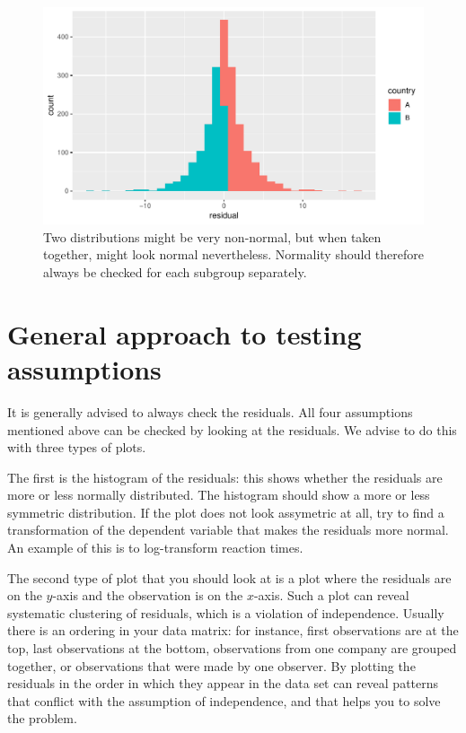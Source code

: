 \documentclass[]{report}\usepackage[]{graphicx}\usepackage[]{color}
\makeatletter
\def\maxwidth{ %
  \ifdim\Gin@nat@width>\linewidth
    \linewidth
  \else
    \Gin@nat@width
  \fi
}
\newenvironment{knitrout}{}{} %
\makeatother
\begin{document}
\begin{knitrout}
\color{fgcolor}\begin{figure}

{\centering \includegraphics[width=\maxwidth]{figure/ass_21a-1} 

}

\caption[Two distributions might be very non-normal, but when taken together, might look normal nevertheless]{Two distributions might be very non-normal, but when taken together, might look normal nevertheless. Normality should therefore always be checked for each subgroup separately.}\label{fig:ass_21a}
\end{figure}


\end{knitrout}



\section{General approach to testing assumptions}

It is generally advised to always check the residuals. All four assumptions mentioned above can be checked by looking at the residuals. We advise to do this with three types of plots. 

The first is the histogram of the residuals: this shows whether the residuals are more or less normally distributed. The histogram should show a more or less symmetric distribution. If the plot does not look assymetric at all, try to find a transformation of the dependent variable that makes the residuals more normal. An example of this is to log-transform reaction times. 

The second type of plot that you should look at is a plot where the residuals are on the $y$-axis and the observation is on the $x$-axis. Such a plot can reveal systematic clustering of residuals, which is a violation of independence. Usually there is an ordering in your data matrix: for instance, first observations are at the top, last observations at the bottom, observations from one company are grouped together, or observations that were made by one observer. By plotting the residuals in the order in which they appear in the data set can reveal patterns that conflict with the assumption of independence, and that helps you to solve the problem. 
\end{document}
